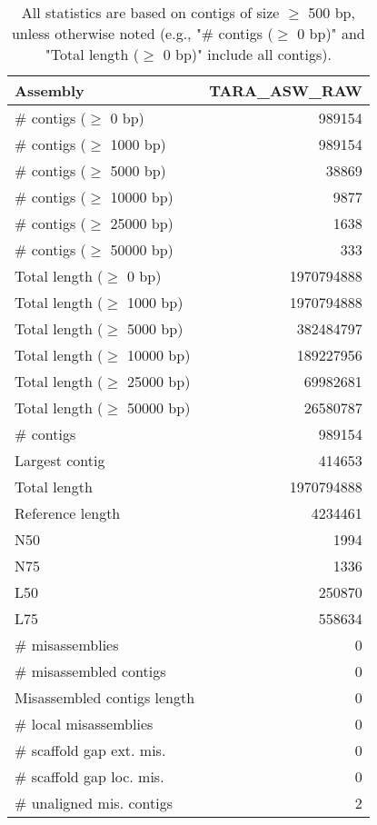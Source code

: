\documentclass[12pt,a4paper]{article}
\begin{document}
\begin{table}[ht]
\begin{center}
\caption{All statistics are based on contigs of size $\geq$ 500 bp, unless otherwise noted (e.g., "\# contigs ($\geq$ 0 bp)" and "Total length ($\geq$ 0 bp)" include all contigs).}
\begin{tabular}{|l*{1}{|r}|}
\hline
Assembly & TARA\_ASW\_RAW \\ \hline
\# contigs ($\geq$ 0 bp) & 989154 \\ \hline
\# contigs ($\geq$ 1000 bp) & 989154 \\ \hline
\# contigs ($\geq$ 5000 bp) & 38869 \\ \hline
\# contigs ($\geq$ 10000 bp) & 9877 \\ \hline
\# contigs ($\geq$ 25000 bp) & 1638 \\ \hline
\# contigs ($\geq$ 50000 bp) & 333 \\ \hline
Total length ($\geq$ 0 bp) & 1970794888 \\ \hline
Total length ($\geq$ 1000 bp) & 1970794888 \\ \hline
Total length ($\geq$ 5000 bp) & 382484797 \\ \hline
Total length ($\geq$ 10000 bp) & 189227956 \\ \hline
Total length ($\geq$ 25000 bp) & 69982681 \\ \hline
Total length ($\geq$ 50000 bp) & 26580787 \\ \hline
\# contigs & 989154 \\ \hline
Largest contig & 414653 \\ \hline
Total length & 1970794888 \\ \hline
Reference length & 4234461 \\ \hline
N50 & 1994 \\ \hline
N75 & 1336 \\ \hline
L50 & 250870 \\ \hline
L75 & 558634 \\ \hline
\# misassemblies & 0 \\ \hline
\# misassembled contigs & 0 \\ \hline
Misassembled contigs length & 0 \\ \hline
\# local misassemblies & 0 \\ \hline
\# scaffold gap ext. mis. & 0 \\ \hline
\# scaffold gap loc. mis. & 0 \\ \hline
\# unaligned mis. contigs & 2 \\ \hline

\end{tabular}
\end{center}
\end{table}
\end{document}
